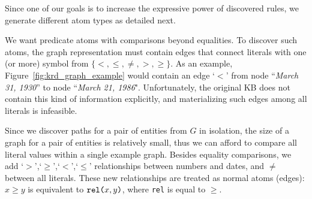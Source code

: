 %

Since one of our goals is to increase the expressive power of discovered rules, we generate different atom types as detailed next.

\noindent {}
We want predicate atoms with comparisons beyond equalities.
To discover such atoms, the graph representation must contain edges that connect literals with one (or more) symbol from $\{<,\leq,\neq,>,\geq\}$. As an example, Figure~\ref{fig:krd_graph_example} would contain an edge `$<$' from node ``\textit{March 31, 1930}'' to node ``\textit{March 21, 1986}". Unfortunately, the original KB does not contain this kind of information explicitly, and materializing such edges among all literals is infeasible.

Since we discover paths for a pair of entities from $G$ in isolation, the size of a graph for a pair of entities is relatively small, thus we can afford to compare all literal values within a single example graph. 
Besides equality comparisons, we add `$>$',`$\geq$',`$<$',`$\leq$' relationships between numbers and dates, and $\neq$ between all literals. These new relationships are treated as normal atoms (edges): $x \geq y$ is equivalent to $\texttt{rel(}x,y\texttt{)}$, where \texttt{rel} is equal to $\geq$. 

